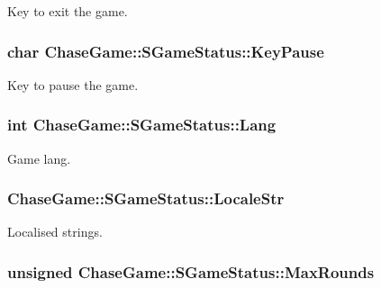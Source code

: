 Key to exit the game. 

\hypertarget{struct_chase_game_1_1_s_game_status_aaa0cca00432a2ac7fae4be521164f5c2}{
\subsubsection[{Key\-Pause}]{\setlength{\rightskip}{0pt plus 5cm}char Chase\-Game\-::\-S\-Game\-Status\-::\-Key\-Pause}}\label{struct_chase_game_1_1_s_game_status_aaa0cca00432a2ac7fae4be521164f5c2}


Key to pause the game. 

\hypertarget{struct_chase_game_1_1_s_game_status_a93c5db2ceb07569075406e865949b4d9}{
\subsubsection[{Lang}]{\setlength{\rightskip}{0pt plus 5cm}int Chase\-Game\-::\-S\-Game\-Status\-::\-Lang}}\label{struct_chase_game_1_1_s_game_status_a93c5db2ceb07569075406e865949b4d9}


Game lang. 

\hypertarget{struct_chase_game_1_1_s_game_status_a697729a081cae30a6b85c5a16a5f9f70}{
\subsubsection[{Locale\-Str}]{ Chase\-Game\-::\-S\-Game\-Status\-::\-Locale\-Str}}\label{struct_chase_game_1_1_s_game_status_a697729a081cae30a6b85c5a16a5f9f70}


Localised strings. 

\hypertarget{struct_chase_game_1_1_s_game_status_a812deafc733953eaa199eba4ea8216f7}{
\subsubsection[{Max\-Rounds}]{\setlength{\rightskip}{0pt plus 5cm}unsigned Chase\-Game\-::\-S\-Game\-Status\-::\-Max\-Rounds}}\label{struct_chase_game_1_1_s_game_status_a812deafc733953eaa199eba4ea8216f7}


